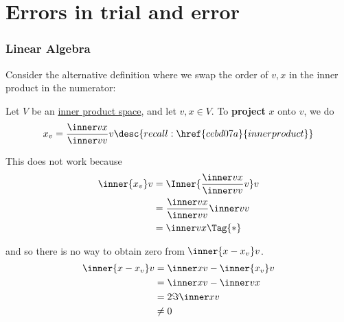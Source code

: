 \chapter{Errors in trial and error}\label{ca9f28e}

\begin{toc}
\end{toc}

\subsection{Linear Algebra}\label{b889457}

\label{ddad872}

Consider the alternative definition where we swap the order of $v,x$ in the
inner product in the numerator:

Let $V$ be an \href{b9935c8}{inner product space}, and let $v,x\in V$. To
\textbf{project} $x$ onto $v$, we do
$$
  x_v=\frac{\inner vx}{\inner vv}v\desc{recall: \href{cebd07a}{inner product}}
$$

This does not work because
\begin{align*}
  \inner{x_v}v
   &=\Inner{\frac{\inner vx}{\inner vv}v}v \\
   &=\frac{\inner vx}{\inner vv}\inner vv  \\
   &=\inner vx\Tag{*}
\end{align*}

and so there is no way to obtain zero from $\inner{x-x_v}v$.
\begin{align*}
  \inner{x-x_v}v
   &=\inner xv-\inner{x_v}v \\
   &=\inner xv-\inner vx    \\
   &=2\Im{\inner xv}        \\
   &\neq0
\end{align*}

